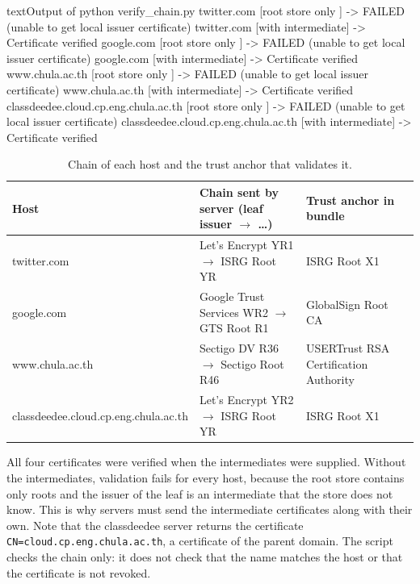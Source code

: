     \pagebreak

        \begin{codeblock}[]{text}{Output of python verify\_chain.py}
            twitter.com       [root store only ] -> FAILED (unable to get local issuer certificate)
            twitter.com       [with intermediate] -> Certificate verified
            google.com        [root store only ] -> FAILED (unable to get local issuer certificate)
            google.com        [with intermediate] -> Certificate verified
            www.chula.ac.th   [root store only ] -> FAILED (unable to get local issuer certificate)
            www.chula.ac.th   [with intermediate] -> Certificate verified
            classdeedee.cloud.cp.eng.chula.ac.th [root store only ] -> FAILED (unable to get local issuer certificate)
            classdeedee.cloud.cp.eng.chula.ac.th [with intermediate] -> Certificate verified
        \end{codeblock}

        \begin{table}[h]
            \centering
            \small
            \begin{tabular}{p{}p{}p{}}
                \toprule
                Host & Chain sent by server (leaf issuer $\rightarrow$ \ldots) & Trust anchor in bundle \\
                \midrule
                twitter.com & Let's Encrypt YR1 $\rightarrow$ ISRG Root YR & ISRG Root X1 \\
                google.com & Google Trust Services WR2 $\rightarrow$ GTS Root R1 & GlobalSign Root CA \\
                www.chula.ac.th & Sectigo DV R36 $\rightarrow$ Sectigo Root R46 & USERTrust RSA Certification Authority \\
                classdeedee.cloud.cp.eng.\allowbreak chula.ac.th & Let's Encrypt YR2 $\rightarrow$ ISRG Root YR & ISRG Root X1 \\
                \bottomrule
            \end{tabular}
            \caption{Chain of each host and the trust anchor that validates it.}
        \end{table}

        All four certificates were verified when the intermediates were supplied. Without the
        intermediates, validation fails for every host, because the root store contains only
        roots and the issuer of the leaf is an intermediate that the store does not know.
        This is why servers must send the intermediate certificates along with their own.
        Note that the classdeedee server returns the certificate
        \texttt{CN=cloud.cp.eng.chula.ac.th}, a certificate of the parent domain. The script checks the
        chain only: it does not check that the name matches the host or that the certificate is
        not revoked.

